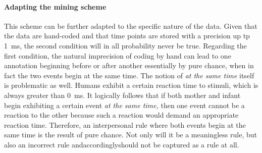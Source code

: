 \paragraph{Adapting the mining scheme}
This scheme can be further adapted to the specific nature of the data. Given that the data are hand-coded and that time points are stored with a precision up tp 1~ms, the second condition will in all probability never be true. Regarding the first condition, the natural imprecision of coding by hand can lead to one annotation beginning before or after another essentially by pure chance, when in fact the two events begin at the same time. The notion of \emph{at the same time} itself is problematic as well. Humans exhibit a certain reaction time to stimuli, which is always greater than 0~ms. It logically follows that if both mother and infant begin exhibiting a certain event \emph{at the same time,} then one event cannot be a reaction to the other because such a reaction would demand an appropriate reaction time. Therefore, an interpersonal rule where both events begin at the same time is the result of pure chance. Not only will it be a meaningless rule, but also an incorrect rule and\dash accordingly\dash should not be captured as a rule at all.

